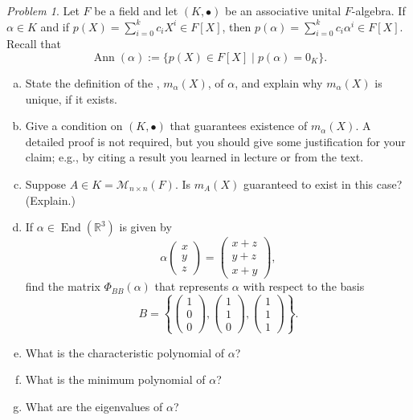 \documentclass[11pt]{paper}
\theoremstyle{remark}
\newtheorem{problem}{Problem}
\newcommand{\<}{\ensuremath{\langle}}
\renewcommand{\>}{\ensuremath{\rangle}}
\newcommand\fld[1]{\ensuremath{\mathbb{#1}}}
\newcommand\R{\ensuremath{\fld{R}}}
\newcommand\Ann{\ensuremath{\operatorname{Ann}}}
\newcommand\End{\ensuremath{\operatorname{End}}}
\begin{document}
\probskip
\begin{problem}
Let $F$ be  a field and let $(K, \bullet)$ be an associative unital
$F$-algebra.  If $\alpha \in K$ and if $p(X) = \sum_{i=0}^k c_i X^i \in  F[X]$,
then $p(\alpha) = \sum_{i=0}^k c_i \alpha^i \in  F[X]$.  Recall that 
\[
\Ann(\alpha) := \{p(X) \in F[X] \mid p(\alpha) = 0_K\}.
\]
\begin{enumerate}[(a)]
\item State the definition of the , $m_\alpha(X)$, of
  $\alpha$, and explain why $m_\alpha(X)$ is unique, if it exists.
\item Give a condition on $(K, \bullet)$ that guarantees existence of 
 $m_\alpha(X)$. A detailed proof is not required, but you should give some
  justification for your claim; e.g., by citing a result you learned in
  lecture or from the text. 
\item Suppose $A \in K = \mathcal{M}_{n\times n}(F)$. Is $m_A(X)$ guaranteed to
  exist in this case? (Explain.)

\item  If $\alpha\in \End(\R^3)$ is given by 
\[
\alpha 
\begin{pmatrix}
x \\  y \\ z
\end{pmatrix}
  = 
\begin{pmatrix}
x +z \\  y+z \\ x+y
\end{pmatrix},
\]
find the matrix $\Phi_{BB}(\alpha)$ that represents $\alpha$ with
  respect to the basis  
\[
B = \left\{ 
\begin{pmatrix}1 \\  0 \\ 0\end{pmatrix},
\begin{pmatrix}1 \\  1 \\ 0\end{pmatrix},
\begin{pmatrix}1 \\  1 \\ 1\end{pmatrix}\right\}.
\]
\item What is the characteristic polynomial of $\alpha$? 
\item What is the minimum polynomial of $\alpha$?
\item What are the eigenvalues of $\alpha$?
\end{enumerate}
\end{problem}
\end{document}
